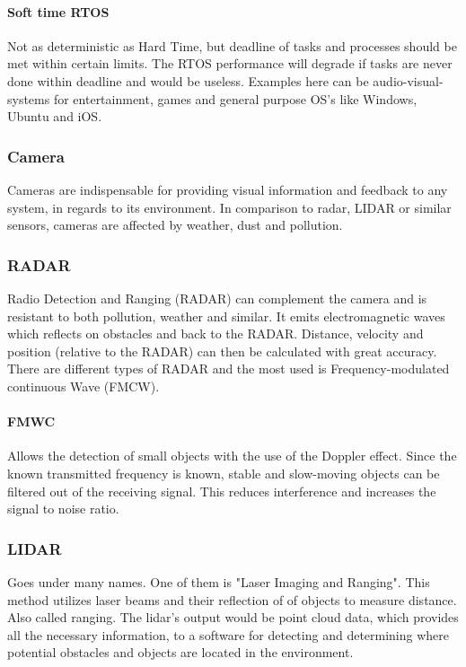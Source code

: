 \documentclass[conference]{IEEEtran}
\begin{document}
		 \paragraph{Soft time RTOS}
		 Not as deterministic as Hard Time, but deadline of tasks and processes should be met within
		 certain limits. The RTOS performance will degrade if tasks are never done within deadline and
		 would be useless. Examples here can be audio-visual-systems for entertainment, games and general purpose
		 OS's like Windows, Ubuntu and iOS.
	 \subsubsection{Camera}
		 Cameras are indispensable for providing visual information and feedback to any system,
		 in regards to its environment. In comparison to radar, LIDAR or similar sensors,
		 cameras are affected by weather, dust and pollution.
	 \subsubsection{RADAR}
		 Radio Detection and Ranging (RADAR) can complement the camera and is resistant to both
		 pollution, weather and similar. It emits electromagnetic waves which reflects on obstacles
		 and back to the RADAR. Distance, velocity and position (relative to the RADAR) can then
		 be calculated with great accuracy. There are different types of RADAR and the most used
		 is Frequency-modulated continuous Wave (FMCW).\cite{Wiki:RADAR}

		 \paragraph{FMWC}
		 Allows the detection of small objects with the use of the Doppler effect. Since the
		 known transmitted frequency is known, stable and slow-moving objects can be filtered
		 out of the receiving signal. This reduces interference and increases the signal to noise
		 ratio.
	 \subsubsection{LIDAR}
		 Goes under many names. One of them is "Laser Imaging and Ranging".
		 This method utilizes laser beams and their reflection of of objects to measure distance.
		 Also called ranging. The lidar's output would be point cloud data, which provides all the
		 necessary information, to a software for detecting and determining where potential
		 obstacles and objects are located in the environment.\cite{Wiki:LIDAR}
\end{document}
